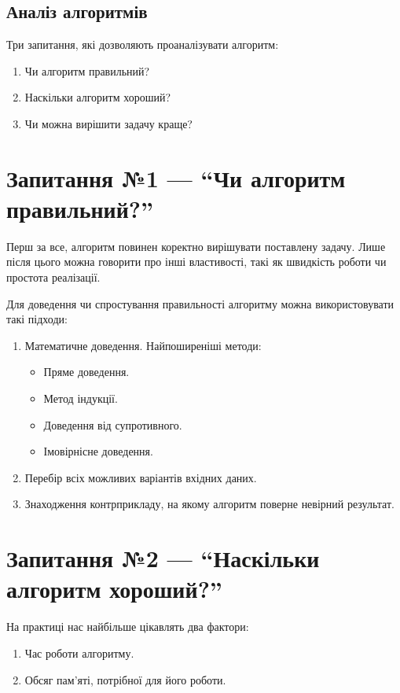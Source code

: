 \documentclass[12pt,a4paper]{report}
\begin{document}
\begin{minipage}{\linewidth}
\subsection*{Аналіз алгоритмів}
Три запитання, які дозволяють проаналізувати алгоритм:
\begin{enumerate}
    \item Чи алгоритм правильний?
    \item Наскільки алгоритм хороший?
    \item Чи можна вирішити задачу краще?
\end{enumerate}
\end{minipage}


\section{Запитання №1 --- ``Чи алгоритм правильний?''}
Перш за все, алгоритм повинен коректно вирішувати поставлену задачу. Лише після цього можна говорити про інші властивості, такі як швидкість роботи чи простота реалізації.

Для доведення чи спростування правильності алгоритму можна використовувати такі підходи:
\begin{enumerate}
    \item Математичне доведення. Найпоширеніші методи:
        \begin{itemize}
            \item Пряме доведення.
            \item Метод індукції.
            \item Доведення від супротивного.
            \item Імовірнісне доведення.
        \end{itemize}
    \item Перебір всіх можливих варіантів вхідних даних.
    \item Знаходження контрприкладу, на якому алгоритм поверне невірний результат.
\end{enumerate}



\section{Запитання №2 --- ``Наскільки алгоритм хороший?''}
На практиці нас найбільше цікавлять два фактори:
\begin{enumerate}
    \item Час роботи алгоритму.
    \item Обсяг пам’яті, потрібної для його роботи.
\end{enumerate}
\end{document}
